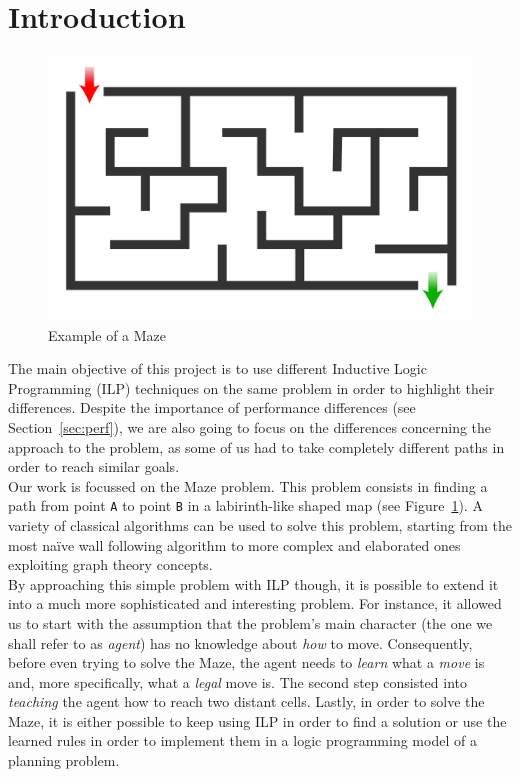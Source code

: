 \section{Introduction}\label{sec:intro}

\begin{figure}[b]
    \centering
    \includegraphics[scale=0.1]{img/Maze_simple.svg.png}
    \caption{Example of a Maze}\label{fig:fig1}
\end{figure}

The main objective of this project is to use different Inductive Logic Programming (ILP) techniques on the same problem in order to highlight
their differences. Despite the importance of performance differences (see Section~\ref{sec:perf}), we are also going to focus on the differences
concerning the approach to the problem, as some of us had to take completely different paths in order to reach similar goals.\\

Our work is focussed on the Maze problem. This problem consists in finding a path from point \texttt{A}
to point \texttt{B} in a labirinth-like shaped map (see Figure~\ref{fig:fig1}). A variety of classical algorithms
can be used to solve this problem, starting from the most naïve wall following algorithm to more complex and elaborated
ones exploiting graph theory concepts.\\
By approaching this simple problem with ILP though, it is possible to extend it into a much more sophisticated and interesting
problem. For instance, it allowed us to start with the assumption that the problem's main character (the
one we shall refer to as \emph{agent}) has no knowledge about \emph{how} to move. Consequently, before even trying
to solve the Maze, the agent needs to \emph{learn} what a \emph{move} is and, more specifically, what a \emph{legal} move is. The second
step consisted into \emph{teaching} the agent how to reach two distant cells. Lastly, in order to solve the Maze, it is either possible
to keep using ILP in order to find a solution or use the learned rules in order to implement them in a logic programming model of a planning
problem.\\

